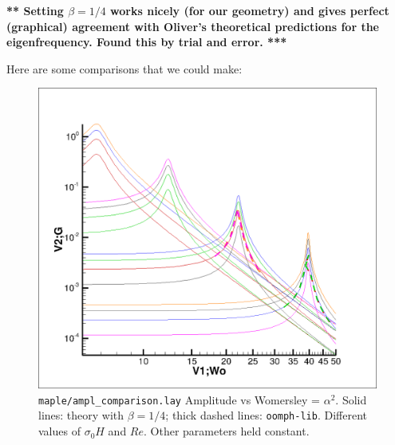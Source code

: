 \documentclass[aps,prl,reprint,superscriptaddress,floatfix]{revtex4-1}
\begin{document}
{\bf *** Setting $\beta =  1/4$ works nicely (for our geometry)
and gives perfect (graphical) agreement with Oliver's theoretical 
predictions for the eigenfrequency. Found this by trial and error. ***}

\clearpage

Here are some comparisons that we could make:

\begin{figure}[h]
\includegraphics[width=0.99\linewidth]{maple/ampl_comparison.png}
\caption{\label{ampl_comparison.png} {\tt maple/ampl\_comparison.lay} 
Amplitude vs Womersley = $\alpha^2$. Solid lines: theory with 
$\beta = 1/4$; thick dashed lines: {\tt oomph-lib}. Different values
of $\sigma_0 H$ and $Re$. Other parameters held constant.}
\end{figure}
\end{document}

